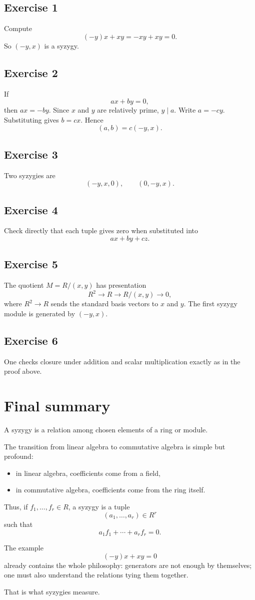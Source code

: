 \documentclass[11pt]{article}
\theoremstyle{definition}
\theoremstyle{remark}
\begin{document}
	\subsection*{Exercise 1}
	Compute
	\[
	(-y)x+xy=-xy+xy=0.
	\]
	So \((-y,x)\) is a syzygy.
	
	\subsection*{Exercise 2}
	If
	\[
	ax+by=0,
	\]
	then \(ax=-by\). Since \(x\) and \(y\) are relatively prime, \(y\mid a\). Write \(a=-cy\). Substituting gives \(b=cx\). Hence
	\[
	(a,b)=c(-y,x).
	\]
	
	\subsection*{Exercise 3}
	Two syzygies are
	\[
	(-y,x,0),\qquad (0,-y,x).
	\]
	
	\subsection*{Exercise 4}
	Check directly that each tuple gives zero when substituted into
	\[
	ax+by+cz.
	\]
	
	\subsection*{Exercise 5}
	The quotient \(M=R/(x,y)\) has presentation
	\[
	R^2\to R\to R/(x,y)\to 0,
	\]
	where \(R^2\to R\) sends the standard basis vectors to \(x\) and \(y\). The first syzygy module is generated by \((-y,x)\).
	
	\subsection*{Exercise 6}
	One checks closure under addition and scalar multiplication exactly as in the proof above.
	
	\section{Final summary}
	
	A syzygy is a relation among chosen elements of a ring or module.
	
	The transition from linear algebra to commutative algebra is simple but profound:
	
	\begin{itemize}[leftmargin=2em]
		\item in linear algebra, coefficients come from a field,
		\item in commutative algebra, coefficients come from the ring itself.
	\end{itemize}
	
	Thus, if \(f_1,\dots,f_r\in R\), a syzygy is a tuple
	\[
	(a_1,\dots,a_r)\in R^r
	\]
	such that
	\[
	a_1f_1+\cdots+a_rf_r=0.
	\]
	
	The example
	\[
	(-y)x+xy=0
	\]
	already contains the whole philosophy: generators are not enough by themselves; one must also understand the relations tying them together.
	
	That is what syzygies measure.
	
\end{document}
